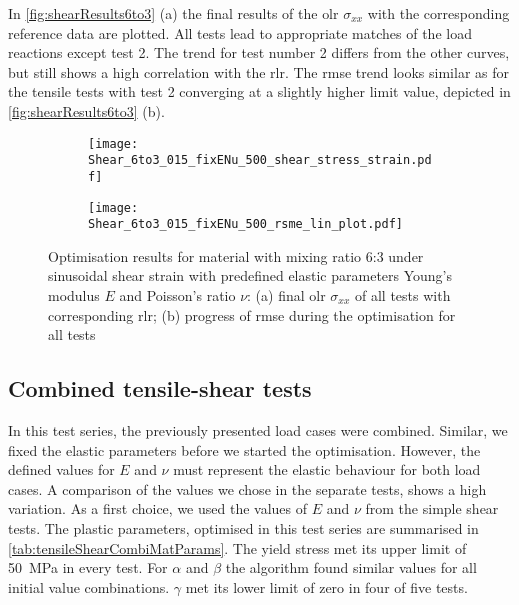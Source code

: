 In \autoref{fig:shearResults6to3} (a) the final results of the \acrlong{olr} $\sigma_{xx}$ with the corresponding reference data are plotted.
All tests lead to appropriate matches of the load reactions except test 2.
The trend for test number 2 differs from the other curves, but still shows a high correlation with the \acrlong{rlr}.
The \acrshort{rmse} trend looks similar as for the tensile tests with test 2 converging at a slightly higher limit value, depicted in \autoref{fig:shearResults6to3} (b). 


\begin{figure}[H]
\centering
\begin{subfigure}[t]{0.495\textwidth}
    \centering
     \texttt{[image: Shear\_6to3\_015\_fixENu\_500\_shear\_stress\_strain.pdf]}
        \caption{}
        \label{subfig:shearStressStrain6to3}
\end{subfigure}
\hfill
\begin{subfigure}[t]{0.495\textwidth}
    \centering
    \texttt{[image: Shear\_6to3\_015\_fixENu\_500\_rsme\_lin\_plot.pdf]}
        \caption{}
        \label{subfig:shearRMSE}
\end{subfigure}
\caption{Optimisation results for material with mixing ratio 6:3 under sinusoidal shear strain with predefined elastic parameters Young's modulus $E$ and Poisson's ratio $\nu$: (a) final \acrlong{olr} $\sigma_{xx}$ of all tests with corresponding \acrfull{rlr}; (b) progress of \acrfull{rmse} during the optimisation for all tests}
\label{fig:shearResults6to3}
\end{figure}

\subsection{Combined tensile-shear tests}\label{subsec:tensileShearCombi}

In this test series, the previously presented load cases were combined. Similar, we fixed the elastic parameters before we started the optimisation. However, the defined values for $E$ and $\nu$ must represent the elastic behaviour for both load cases. A comparison of the values we chose in the separate tests, shows a high variation. 
As a first choice, we used the values of $E$ and $\nu$ from the simple shear tests. The plastic parameters, optimised in this test series are summarised in \autoref{tab:tensileShearCombiMatParams}. The yield stress met its upper limit of 50 MPa in every test. For $\alpha$ and $\beta$ the algorithm found similar values for all initial value combinations. $\gamma$ met its lower limit of zero in four of five tests. 

